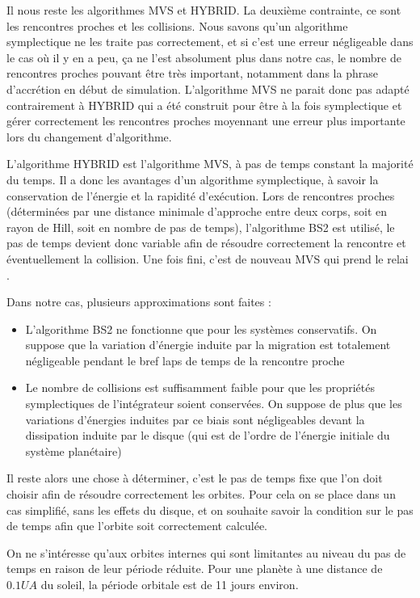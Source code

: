 Il nous reste les algorithmes MVS et HYBRID. La deuxième contrainte, ce sont les rencontres proches et les collisions. Nous savons qu'un algorithme symplectique ne les traite pas correctement, et si c'est une erreur négligeable dans le cas où il y en a peu, ça ne l'est absolument plus dans notre cas, le nombre de rencontres proches pouvant être très important, notamment dans la phrase d'accrétion en début de simulation. L'algorithme MVS ne parait donc pas adapté contrairement à HYBRID qui a été construit pour être à la fois symplectique et gérer correctement les rencontres proches moyennant une erreur plus importante lors du changement d'algorithme. 

L'algorithme HYBRID est l'algorithme MVS, à pas de temps constant la majorité du temps. Il a donc les avantages d'un algorithme symplectique, à savoir la conservation de l'énergie et la rapidité d'exécution. Lors de rencontres proches (déterminées par une distance minimale d'approche entre deux corps, soit en rayon de Hill, soit en nombre de pas de temps), l'algorithme BS2 est utilisé, le pas de temps devient donc variable afin de résoudre correctement la rencontre et éventuellement la collision. Une fois fini, c'est de nouveau MVS qui prend le relai \citep[voir aussi ][]{mcneil2009new}. 

Dans notre cas, plusieurs approximations sont faites : 
\begin{itemize}
\item L'algorithme BS2 ne fonctionne que pour les systèmes conservatifs. On suppose que la variation d'énergie induite par la migration est totalement négligeable pendant le bref laps de temps de la rencontre proche
\item Le nombre de collisions est suffisamment faible pour que les propriétés symplectiques de l'intégrateur soient conservées. On suppose de plus que les variations d'énergies induites par ce biais sont négligeables devant la dissipation induite par le disque (qui est de l'ordre de l'énergie initiale du système planétaire)
\end{itemize}

Il reste alors une chose à déterminer, c'est le pas de temps fixe que l'on doit choisir afin de résoudre correctement les orbites. Pour cela on se place dans un cas simplifié, sans les effets du disque, et on souhaite savoir la condition sur le pas de temps afin que l'orbite soit correctement calculée. 

On ne s'intéresse qu'aux orbites internes qui sont limitantes au niveau du pas de temps en raison de leur période réduite. Pour une planète à une distance de $0.1\unit{UA}$ du soleil, la période orbitale est de 11 jours environ.

